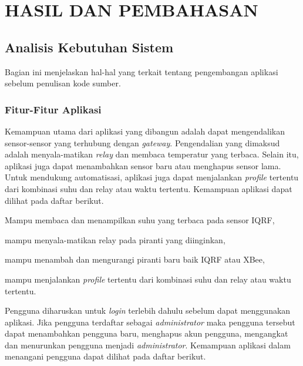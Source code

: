 
\chapter{HASIL DAN PEMBAHASAN}
	\section{Analisis Kebutuhan Sistem}
		Bagian ini menjelaskan hal-hal yang terkait tentang pengembangan aplikasi sebelum penulisan kode sumber.

		\subsection{Fitur-Fitur Aplikasi}
			Kemampuan utama dari aplikasi yang dibangun adalah dapat mengendalikan sensor-sensor yang terhubung dengan \emph{gateway}. Pengendalian yang dimaksud adalah menyala-matikan \emph{relay} dan membaca temperatur yang terbaca. Selain itu, aplikasi juga dapat menambahkan sensor baru atau menghapus sensor lama. Untuk mendukung automatisasi, aplikasi juga dapat menjalankan \emph{profile} tertentu dari kombinasi suhu dan relay atau waktu tertentu. Kemampuan aplikasi dapat dilihat pada daftar berikut.

			\vspace{-0.5cm}

			\begin{itemize}
			\end{itemize}

			Pengguna diharuskan untuk \emph{login} terlebih dahulu sebelum dapat menggunakan aplikasi. Jika pengguna terdaftar sebagai \emph{administrator} maka pengguna tersebut dapat menambahkan pengguna baru, menghapus akun pengguna, mengangkat dan menurunkan pengguna menjadi \emph{administrator}. Kemampuan aplikasi dalam menangani pengguna dapat dilihat pada daftar berikut.

